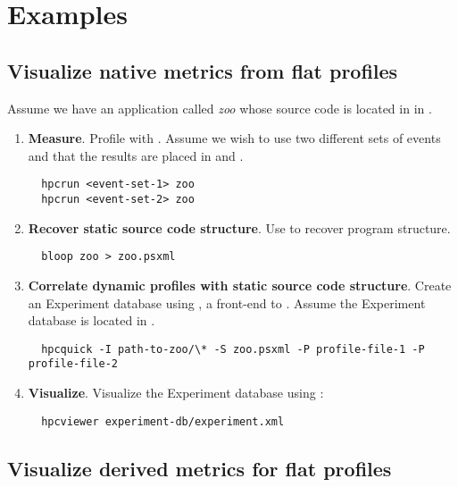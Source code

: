 \documentclass[english]{article}
\begin{document}
\section{Examples}

\subsection{Visualize native metrics from flat profiles}

Assume we have an application called \emph{zoo} whose source code is located in in .

\begin{enumerate}
\item \textbf{Measure}.  Profile with .  Assume we wish to use two different sets of events and that the results are placed in  and .
\begin{verbatim}
  hpcrun <event-set-1> zoo
  hpcrun <event-set-2> zoo
\end{verbatim}

\item \textbf{Recover static source code structure}. Use  to recover program structure.
\begin{verbatim}
  bloop zoo > zoo.psxml
\end{verbatim}

\item \textbf{Correlate dynamic profiles with static source code structure}.
Create an Experiment database using , a front-end to .  Assume the Experiment database is located in .
\begin{verbatim}
  hpcquick -I path-to-zoo/\* -S zoo.psxml -P profile-file-1 -P profile-file-2
\end{verbatim}

\item \textbf{Visualize}.
Visualize the Experiment database using :
\begin{verbatim}
  hpcviewer experiment-db/experiment.xml
\end{verbatim}

\end{enumerate}

\subsection{Visualize derived metrics for flat profiles}
\end{document}
